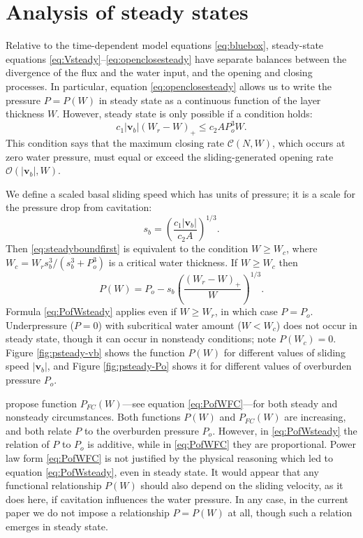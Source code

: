 \documentclass[gmd]{copernicus}   %
\begin{document}
\section{Analysis of steady states}  Relative to the time-dependent model equations \eqref{eq:bluebox}, steady-state equations \eqref{eq:Vsteady}--\eqref{eq:openclosesteady} have separate balances between the divergence of the flux and the water input, and the opening and closing processes.  In particular, equation \eqref{eq:openclosesteady} allows us to write the pressure $P=P(W)$ in steady state as a continuous function of the layer thickness $W$.  However, steady state is only possible if a condition holds:
\begin{equation}
c_1 |\mathbf{v}_b| (W_r - W)_+ \le c_2 A P_o^3 W. \label{eq:steadyboundfirst}
\end{equation}
This condition says that the maximum closing rate $\mathcal{C}(N,W)$, which occurs at zero water pressure, must equal or exceed the sliding-generated opening rate $\mathcal{O}(|\mathbf{v}_b|,W)$.

We define a scaled basal sliding speed which has units of pressure; it is a scale for the pressure drop from cavitation:
\begin{equation}
s_b =  \left(\frac{c_1 |\mathbf{v}_b|}{c_2 A}\right)^{1/3}.  \label{eq:definesb}
\end{equation}
Then \eqref{eq:steadyboundfirst} is equivalent to the condition $W\ge W_c$, where $W_c = W_r s_b^3/(s_b^3 + P_o^3)$ is a critical water thickness.  If $W\ge W_c$ then
\begin{equation}
P(W) = P_o - s_b \left(\frac{(W_r - W)_+}{W}\right)^{1/3}.  \label{eq:PofWsteady}
\end{equation}
Formula \eqref{eq:PofWsteady} applies even if $W\ge W_r$, in which case $P = P_o$.  Underpressure ($P=0$) with subcritical water amount ($W<W_c$) does not occur in steady state, though it can occur in nonsteady conditions; note $P(W_c)=0$.  Figure \ref{fig:psteady-vb} shows the function $P(W)$ for different values of sliding speed $|\mathbf{v}_b|$, and Figure \ref{fig:psteady-Po} shows it for different values of overburden pressure $P_o$.

\cite{FlowersClarke2002_theory} propose function $P_{FC}(W)$---see equation \eqref{eq:PofWFC}---for both steady and nonsteady circumstances.  Both functions $P(W)$ and $P_{FC}(W)$ are increasing, and both relate $P$ to the overburden pressure $P_o$.  However, in \eqref{eq:PofWsteady} the relation of $P$ to $P_o$ is additive, while in \eqref{eq:PofWFC} they are proportional.  Power law form \eqref{eq:PofWFC} is not justified by the physical reasoning which led to equation \eqref{eq:PofWsteady}, even in steady state.   It would appear that any functional relationship $P(W)$ should also depend on the sliding velocity, as it does here, if cavitation influences the water pressure.  In any case, in the current paper we do not impose a relationship $P=P(W)$ at all, though such a relation emerges in steady state.
\end{document}
